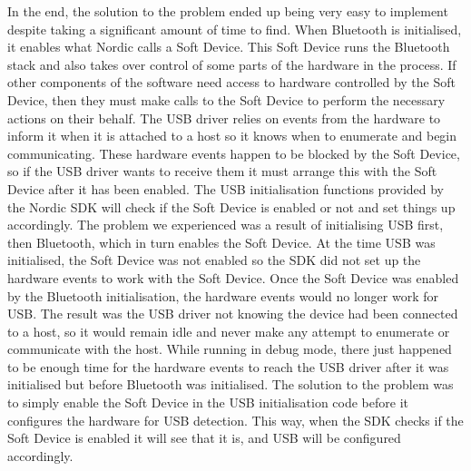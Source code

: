 In the end, the solution to the problem ended up being very easy to implement 
despite taking a significant amount of time to find. When Bluetooth is 
initialised, it enables what Nordic calls a Soft Device. This Soft Device runs 
the Bluetooth stack and also takes over control of some parts of the hardware 
in the process. If other components of the software need access to hardware 
controlled by the Soft Device, then they must make calls to the Soft Device to 
perform the necessary actions on their behalf. The USB driver relies on events 
from the hardware to inform it when it is attached to a host so it knows when 
to enumerate and begin communicating. These hardware events happen to be blocked 
by the Soft Device, so if the USB driver wants to receive them it must arrange 
this with the Soft Device after it has been enabled. The USB initialisation 
functions provided by the Nordic SDK will check if the Soft Device is enabled or 
not and set things up accordingly. The problem we experienced was a result of 
initialising USB first, then Bluetooth, which in turn enables the Soft Device. 
At the time USB was initialised, the Soft Device was not enabled so the SDK did 
not set up the hardware events to work with the Soft Device. Once the Soft Device 
was enabled by the Bluetooth initialisation, the hardware events would no longer 
work for USB. The result was the USB driver not knowing the device had been 
connected to a host, so it would remain idle and never make any attempt to 
enumerate or communicate with the host. While running in debug mode, there just
happened to be enough time for the hardware events to reach the USB driver after 
it was initialised but before Bluetooth was initialised. The solution to the problem
was to simply enable the Soft Device in the USB initialisation code before it
configures the hardware for USB detection. This way, when the SDK checks if the
Soft Device is enabled it will see that it is, and USB will be configured 
accordingly.
